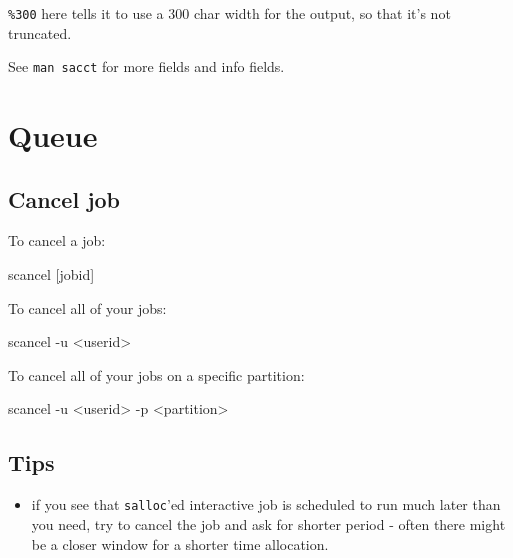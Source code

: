 \documentclass[
]{report}
\newenvironment{Shaded}{\begin{snugshade}}{\end{snugshade}}
\newcommand{\AttributeTok}[1]{\textcolor[rgb]{0.40,0.45,0.13}{#1}}
\newcommand{\ExtensionTok}[1]{\textcolor[rgb]{0.00,0.23,0.31}{#1}}
\newcommand{\NormalTok}[1]{\textcolor[rgb]{0.00,0.23,0.31}{#1}}
\newcommand{\OperatorTok}[1]{\textcolor[rgb]{0.37,0.37,0.37}{#1}}
\newcommand{\PreprocessorTok}[1]{\textcolor[rgb]{0.68,0.00,0.00}{#1}}
\newcommand{\SpecialStringTok}[1]{\textcolor[rgb]{0.13,0.47,0.30}{#1}}
\providecommand{\tightlist}{%
  \setlength{\itemsep}{0pt}\setlength{\parskip}{0pt}}\usepackage{longtable,booktabs,array}
\begin{document}
\texttt{\%300} here tells it to use a 300 char width for the output, so
that it's not truncated.

See \texttt{man\ sacct} for more fields and info fields.

\section{Queue}\label{queue}

\subsection{Cancel job}\label{cancel-job}

To cancel a job:

\begin{Shaded}
\begin{Highlighting}[]
\ExtensionTok{scancel} \PreprocessorTok{[}\SpecialStringTok{jobid}\PreprocessorTok{]}
\end{Highlighting}
\end{Shaded}

To cancel all of your jobs:

\begin{Shaded}
\begin{Highlighting}[]
\ExtensionTok{scancel} \AttributeTok{{-}u} \OperatorTok{\textless{}}\NormalTok{userid}\OperatorTok{\textgreater{}}
\end{Highlighting}
\end{Shaded}

To cancel all of your jobs on a specific partition:

\begin{Shaded}
\begin{Highlighting}[]
\ExtensionTok{scancel} \AttributeTok{{-}u} \OperatorTok{\textless{}}\NormalTok{userid}\OperatorTok{\textgreater{}}\NormalTok{ {-}p }\OperatorTok{\textless{}}\NormalTok{partition}\OperatorTok{\textgreater{}}
\end{Highlighting}
\end{Shaded}

\subsection{Tips}\label{tips}

\begin{itemize}
\tightlist
\item
  if you see that \texttt{salloc}'ed interactive job is scheduled to run
  much later than you need, try to cancel the job and ask for shorter
  period - often there might be a closer window for a shorter time
  allocation.
\end{itemize}
\end{document}

